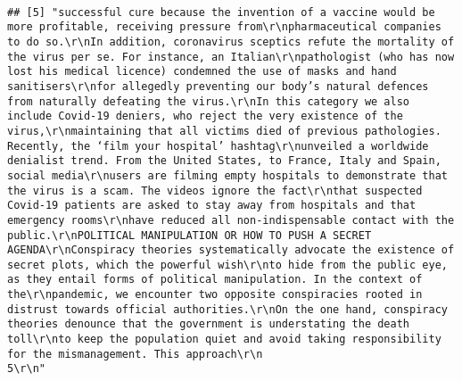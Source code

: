 \documentclass[
]{book}
\begin{document}
\begin{verbatim}
                                                                                                                                                                                                                                                                                             
## [5] "successful cure because the invention of a vaccine would be more profitable, receiving pressure from\r\npharmaceutical companies to do so.\r\nIn addition, coronavirus sceptics refute the mortality of the virus per se. For instance, an Italian\r\npathologist (who has now lost his medical licence) condemned the use of masks and hand sanitisers\r\nfor allegedly preventing our body’s natural defences from naturally defeating the virus.\r\nIn this category we also include Covid-19 deniers, who reject the very existence of the virus,\r\nmaintaining that all victims died of previous pathologies. Recently, the ‘film your hospital’ hashtag\r\nunveiled a worldwide denialist trend. From the United States, to France, Italy and Spain, social media\r\nusers are filming empty hospitals to demonstrate that the virus is a scam. The videos ignore the fact\r\nthat suspected Covid-19 patients are asked to stay away from hospitals and that emergency rooms\r\nhave reduced all non-indispensable contact with the public.\r\nPOLITICAL MANIPULATION OR HOW TO PUSH A SECRET AGENDA\r\nConspiracy theories systematically advocate the existence of secret plots, which the powerful wish\r\nto hide from the public eye, as they entail forms of political manipulation. In the context of the\r\npandemic, we encounter two opposite conspiracies rooted in distrust towards official authorities.\r\nOn the one hand, conspiracy theories denounce that the government is understating the death toll\r\nto keep the population quiet and avoid taking responsibility for the mismanagement. This approach\r\n                                                                                                    5\r\n"                                                                                                                                                                                                                                                                                                                                                                                                                                                                                                                                                                                                                                                                                                                                                                                                                                                                                                                                                                                                                                                                                                                                                                                                                                                                                                                                                                                             
\end{verbatim}
\end{document}
